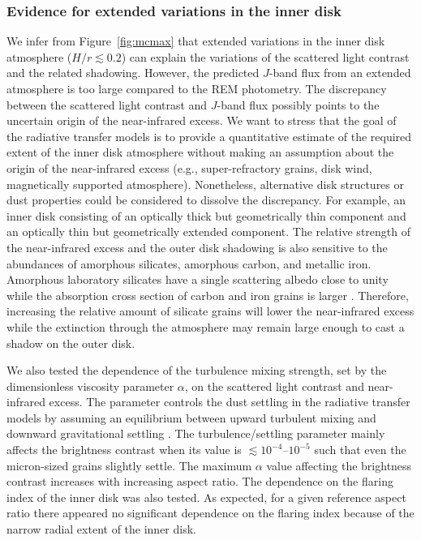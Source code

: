 \documentclass[twocolumn,tighten]{aastex61}
\begin{document}
\subsubsection{Evidence for extended variations in the inner disk}\label{sec:extended_variations}

We infer from Figure~\ref{fig:mcmax} that extended variations in the inner disk atmosphere ($H/r \lesssim 0.2$) can explain the variations of the scattered light contrast and the related shadowing. However, the predicted $J$-band flux from an extended atmosphere is too large compared to the REM photometry. The discrepancy between the scattered light contrast and $J$-band flux possibly points to the uncertain origin of the near-infrared excess. We want to stress that the goal of the radiative transfer models is to provide a quantitative estimate of the required extent of the inner disk atmosphere without making an assumption about the origin of the near-infrared excess (e.g., super-refractory grains, disk wind, magnetically supported atmosphere). Nonetheless, alternative disk structures or dust properties could be considered to dissolve the discrepancy. For example, an inner disk consisting of an optically thick but geometrically thin component and an optically thin but geometrically extended component. The relative strength of the near-infrared excess and the outer disk shadowing is also sensitive to the abundances of amorphous silicates, amorphous carbon, and metallic iron. Amorphous laboratory silicates have a single scattering albedo close to unity \citep{dorschner1995} while the absorption cross section of carbon and iron grains is larger \citep{zubko1996}. Therefore, increasing the relative amount of silicate grains will lower the near-infrared excess while the extinction through the atmosphere may remain large enough to cast a shadow on the outer disk.

We also tested the dependence of the turbulence mixing strength, set by the dimensionless viscosity parameter $\alpha$, on the scattered light contrast and near-infrared excess. The parameter controls the dust settling in the radiative transfer models by assuming an equilibrium between upward turbulent mixing and downward gravitational settling \citep{woitke2016}. The turbulence/settling parameter mainly affects the brightness contrast when its value is $\lesssim$$10^{-4}$--$10^{-5}$ such that even the micron-sized grains slightly settle. The maximum $\alpha$ value affecting the brightness contrast increases with increasing aspect ratio. The dependence on the flaring index of the inner disk was also tested. As expected, for a given reference aspect ratio there appeared no significant dependence on the flaring index because of the narrow radial extent of the inner disk.
\end{document}
